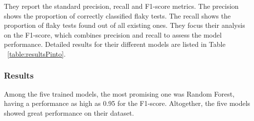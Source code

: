 They report the standard precision, recall and F1-score metrics. The precision shows the proportion of correctly classified flaky tests. The recall shows the proportion of flaky tests found out of all existing ones. 
They focus their analysis on the F1-score, which combines precision and recall to assess the model performance. Detailed results for their different models are listed in Table ~\ref{table:resultsPinto}.

\subsubsection{Results}
Among the five trained models, the most promising one was Random Forest, having a performance as high as 0.95 for the F1-score. Altogether, the five models showed great performance on their dataset.  
